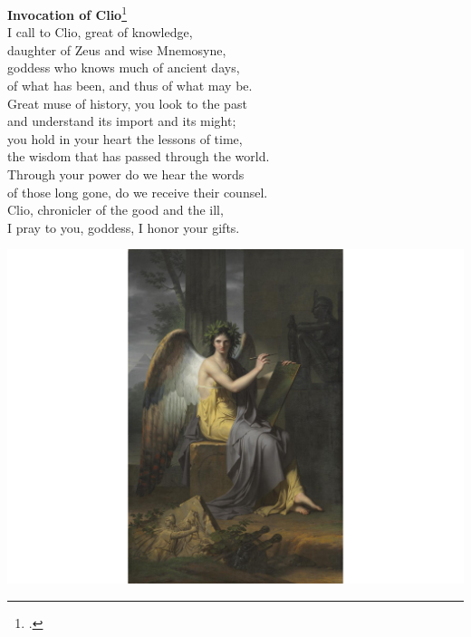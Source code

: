 \documentclass{report}[12pt]
\begin{document}
\begin{minipage}{0.4\linewidth}
  \textbf{Invocation of Clio}\footcite{clio} \\

  I call to Clio, great of knowledge, \\
  daughter of Zeus and wise Mnemosyne, \\
  goddess who knows much of ancient days, \\
  of what has been, and thus of what may be. \\
  Great muse of history, you look to the past \\
  and understand its import and its might; \\
  you hold in your heart the lessons of time, \\
  the wisdom that has passed through the world. \\
  Through your power do we hear the words \\
  of those long gone, do we receive their counsel. \\
  Clio, chronicler of the good and the ill, \\
  I pray to you, goddess, I honor your gifts.
\end{minipage}
\begin{minipage}{0.6\linewidth}
  \includegraphics[scale=0.3]{clio.png}
\end{minipage}  

\vfill  
\hspace{0pt}

\thispagestyle{empty}

\pagebreak

\tableofcontents
\end{document}
